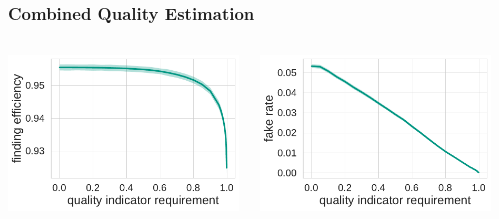 \documentclass[18pt, aspectratio=169]{beamer}
\begin{document}
\begin{frame}
  \frametitle{Combined Quality Estimation}
  \begin{columns}
    \begin{column}{.33\textwidth}
      \centering
      \includegraphics[width=\textwidth]{figures/combined-qi/fullqi_findeff.pdf}\\
    \end{column}
    \begin{column}{.33\textwidth}
      \centering
      \includegraphics[width=\textwidth]{figures/combined-qi/fullqi_fake_rate.pdf}\\
    \end{column}
    \begin{column}{.33\textwidth}
      \centering

\end{column}
\end{columns}
\end{frame}
\end{document}
